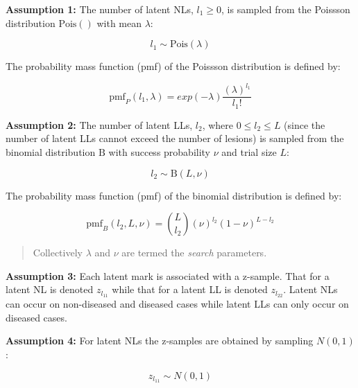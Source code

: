\documentclass[
]{book}
\begin{document}
\textbf{Assumption 1:} The number of latent NLs, \(l_1 \geq 0\), is sampled from the Poissson distribution \(\text{Pois}()\) with mean \(\lambda\):

\begin{equation} 
l_1 \sim \text{Pois}\left ( \lambda \right ) 
\label{eq:rsm-poisson-sampling}
\end{equation}

The probability mass function (pmf) of the Poissson distribution is defined by:

\begin{equation} 
\text{pmf}_{P}\left ( l_1, \lambda \right ) = exp\left ( -\lambda \right ) \frac{{(\lambda)^{l_1}}}{l_1!}
\label{eq:rsm-poisson-pmf}
\end{equation}

\textbf{Assumption 2:} The number of latent LLs, \(l_2\), where \(0 \leq l_2 \leq L\) (since the number of latent LLs cannot exceed the number of lesions) is sampled from the binomial distribution \(\text{B}\) with success probability \(\nu\) and trial size \(L\):

\begin{equation} 
l_2 \sim \text{B}\left ( L, \nu \right ) 
\label{eq:rsm-binomial-sampling}
\end{equation}

The probability mass function (pmf) of the binomial distribution is defined by:

\begin{equation} 
\text{pmf}_{B}\left ( l_2, L, \nu \right ) = \binom{L}{l_2} \left (\nu  \right )^{l_2} \left (1-\nu  \right )^{L-l_2}
\label{eq:rsm-binomial-pmf}
\end{equation}

\begin{quote}
Collectively \(\lambda\) and \(\nu\) are termed the \emph{search} parameters.
\end{quote}

\textbf{Assumption 3:} Each latent mark is associated with a z-sample. That for a latent NL is denoted \(z_{l_11}\) while that for a latent LL is denoted \(z_{l_22}\). Latent NLs can occur on non-diseased and diseased cases while latent LLs can only occur on diseased cases.

\textbf{Assumption 4:} For latent NLs the z-samples are obtained by sampling \(N \left ( 0, 1 \right )\):

\begin{equation} 
z_{l_11} \sim N \left ( 0, 1 \right )
\label{eq:rsm-sampling-l1}
\end{equation}
\end{document}

